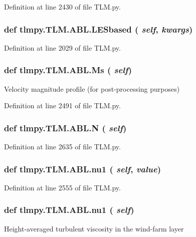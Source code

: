 Definition at line 2430 of file TLM.py.\hypertarget{classtlmpy_1_1TLM_1_1ABL_a151cf679c360998483ca293efd5519c0}{
\subsubsection[{LESbased}]{\setlength{\rightskip}{0pt plus 5cm}def tlmpy.TLM.ABL.LESbased ( {\em self}, \/   {\em kwargs})}}
\label{classtlmpy_1_1TLM_1_1ABL_a151cf679c360998483ca293efd5519c0}


Definition at line 2029 of file TLM.py.\hypertarget{classtlmpy_1_1TLM_1_1ABL_aec4bd3e76d90584947689fd6e88c1a1e}{
\subsubsection[{Ms}]{\setlength{\rightskip}{0pt plus 5cm}def tlmpy.TLM.ABL.Ms ( {\em self})}}
\label{classtlmpy_1_1TLM_1_1ABL_aec4bd3e76d90584947689fd6e88c1a1e}
\begin{DoxyVerb}Velocity magnitude profile (for post-processing purposes)\end{DoxyVerb}
 

Definition at line 2491 of file TLM.py.\hypertarget{classtlmpy_1_1TLM_1_1ABL_aa9596a8cf771914b42a681e73903ea99}{
\subsubsection[{N}]{\setlength{\rightskip}{0pt plus 5cm}def tlmpy.TLM.ABL.N ( {\em self})}}
\label{classtlmpy_1_1TLM_1_1ABL_aa9596a8cf771914b42a681e73903ea99}


Definition at line 2635 of file TLM.py.\hypertarget{classtlmpy_1_1TLM_1_1ABL_aabc3209e21d0bfb4af7d31c13ca6b70e}{
\subsubsection[{nu1}]{\setlength{\rightskip}{0pt plus 5cm}def tlmpy.TLM.ABL.nu1 ( {\em self}, \/   {\em value})}}
\label{classtlmpy_1_1TLM_1_1ABL_aabc3209e21d0bfb4af7d31c13ca6b70e}


Definition at line 2555 of file TLM.py.\hypertarget{classtlmpy_1_1TLM_1_1ABL_aabc3209e21d0bfb4af7d31c13ca6b70e}{
\subsubsection[{nu1}]{\setlength{\rightskip}{0pt plus 5cm}def tlmpy.TLM.ABL.nu1 ( {\em self})}}
\label{classtlmpy_1_1TLM_1_1ABL_aabc3209e21d0bfb4af7d31c13ca6b70e}
\begin{DoxyVerb}Height-averaged turbulent viscosity in the wind-farm layer\end{DoxyVerb}
 

